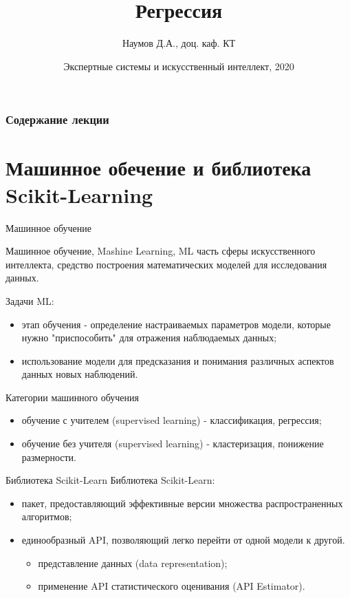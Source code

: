 \documentclass{beamer}
\title[Artifical Intelligence]{Регрессия}
\author{Наумов Д.А., доц. каф. КТ}
\date[11.03.2020] {Экспертные системы и искусственный интеллект, 2020}
\begin{document}
\begin{frame}
  \titlepage
\end{frame}
  
\begin{frame}
  \frametitle{Содержание лекции}
  \tableofcontents  
\end{frame}

\section{Машинное обечение и библиотека Scikit-Learning}

\begin{frame}{Машинное обучение}
\begin{block}{Машинное обучение, Mashine Learning, ML}
часть сферы искусственного интеллекта, средство построения математических моделей для исследования данных.
\end{block}
Задачи ML:
\begin{itemize}
\item этап обучения - определение настраиваемых параметров модели, которые нужно "приспособить" для отражения наблюдаемых данных;
\item использование модели для предсказания и понимания различных аспектов данных новых наблюдений.
\end{itemize}
\begin{block}{Категории машинного обучения}
\begin{itemize}
\item обучение с учителем (supervised learning) - классификация, регрессия;
\item обучение без учителя (supervised learning) - кластеризация, понижение размерности.
\end{itemize}
\end{block}
\end{frame}

\begin{frame}{Библиотека Scikit-Learn}
Библиотека Scikit-Learn:
\begin{itemize}
\item пакет, предоставляющий эффективные версии множества распространенных алгоритмов;
\item единообразный API, позволяющий легко перейти от одной модели к другой.
\begin{itemize}
\item представление данных (data representation);
\item применение API статистического оценивания (API Estimator).
\end{itemize}
\end{itemize}
\end{frame}
\end{document}
